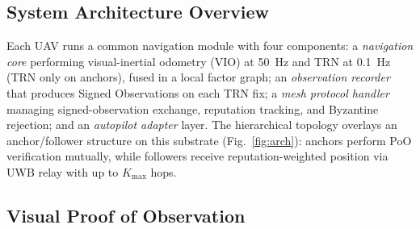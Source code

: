 \documentclass[conference,10pt]{IEEEtran}
\begin{document}
\subsection{System Architecture Overview}

Each UAV runs a common navigation module with four components: a \emph{navigation core} performing visual-inertial odometry (VIO) at 50~Hz and TRN at 0.1~Hz (TRN only on anchors), fused in a local factor graph; an \emph{observation recorder} that produces Signed Observations on each TRN fix; a \emph{mesh protocol handler} managing signed-observation exchange, reputation tracking, and Byzantine rejection; and an \emph{autopilot adapter} layer. The hierarchical topology overlays an anchor/follower structure on this substrate (Fig.~\ref{fig:arch}): anchors perform PoO verification mutually, while followers receive reputation-weighted position via UWB relay with up to $K_\text{max}$ hops.

\subsection{Visual Proof of Observation}
\end{document}
